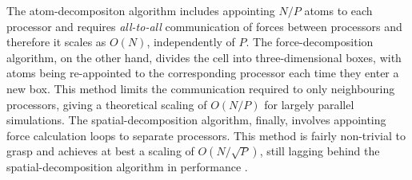 The atom-decompositon algorithm includes appointing $N/P$ atoms to each processor and requires \textit{all-to-all} communication of forces between processors and therefore it scales as $O(N)$, independently of $P$. 
The force-decomposition algorithm, on the other hand, divides the cell into three-dimensional boxes, with atoms being re-appointed to the corresponding processor each time they enter a new box. 
This method limits the communication required to only neighbouring processors, giving a theoretical scaling of $O(N/P)$ for largely parallel simulations.
The spatial-decomposition algorithm, finally, involves appointing force calculation loops to separate processors.
This method is fairly non-trivial to grasp and achieves at best a scaling of $O(N/\sqrt{P})$, still lagging behind the spatial-decomposition algorithm in performance \cite{fincham1987parallel,lammpsMD}.


